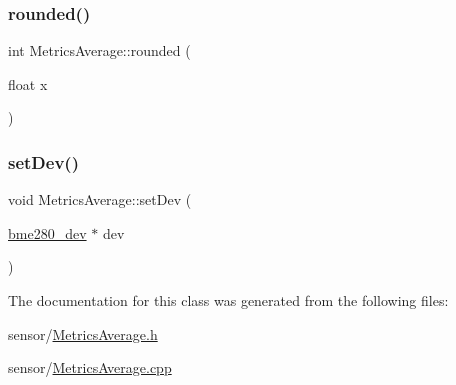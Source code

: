 \mbox{\label{class_metrics_average_a225a5cef622b47b5388fec11c7c50df3}} 
\subsubsection{\texorpdfstring{rounded()}{rounded()}}
{\footnotesize\ttfamily int Metrics\+Average\+::rounded (\begin{DoxyParamCaption}\item[{float}]{x }\end{DoxyParamCaption})}

\mbox{\label{class_metrics_average_a73810dc84f599b5e2fc3b7b4c34f326c}} 
\subsubsection{\texorpdfstring{set\+Dev()}{setDev()}}
{\footnotesize\ttfamily void Metrics\+Average\+::set\+Dev (\begin{DoxyParamCaption}\item[{\hyperlink{structbme280__dev}{bme280\+\_\+dev} $\ast$}]{dev }\end{DoxyParamCaption})}



The documentation for this class was generated from the following files\+:\begin{DoxyCompactItemize}
\item 
sensor/\hyperlink{_metrics_average_8h}{Metrics\+Average.\+h}\item 
sensor/\hyperlink{_metrics_average_8cpp}{Metrics\+Average.\+cpp}\end{DoxyCompactItemize}
